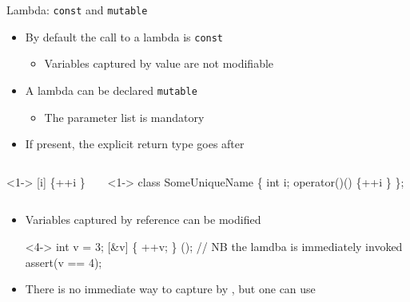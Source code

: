 \begin{frame}[fragile]{Lambda: \texttt{const} and \texttt{mutable}}
  \begin{itemize}
  \item By default the call to a lambda is \texttt{const}
    \begin{itemize}
    \item Variables captured by value are not modifiable
    \end{itemize}
  \item<2-> A lambda can be declared \texttt{mutable}
    \begin{itemize}
    \item The parameter list is mandatory
    \end{itemize}
  \item<3-> If present, the explicit return type goes after 
  \end{itemize}

  \begin{columns}[T]
    \begin{column}{.5\textwidth}
      \begin{codeblock}<1->{
[i] \{\ddd ++i \ddd\}}\end{codeblock}
    \end{column}

    \begin{column}{.5\textwidth}
      \begin{codeblock}<1->{
class SomeUniqueName \{
  int i;
  \ddd
   operator()() \{\ddd ++i \ddd\}
\};}\end{codeblock}
    \end{column}
  \end{columns}

  \begin{itemize}
  \item<4-> Variables captured by reference can be modified

  \begin{codeblock}<4->
int v = 3;
[\&v] \{ ++v; \} (); // NB the lamdba is immediately invoked
assert(v == 4);\end{codeblock}

  \item<5-> There is no immediate way to capture by ,
    but one can use 
  \end{itemize}

\end{frame}

